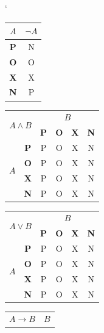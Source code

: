 \documentclass[11pt,a4paper]{article}
\begin{document}
\catcode`
\begin{table}[h]
    \begin{center}
        \begin{tabular}{|c|c|}\hline
            $A$   &   $\neg{A}$  \\ \hline
            \textbf{P}  &   N   \\  \hline
            \textbf{O}  &   O   \\  \hline
            \textbf{X}  &   X   \\  \hline
            \textbf{N}  &   P   \\ \hline
        \end{tabular}
        \begin{tabular}[p]{|c|c|c|c|c|c|}\hline
             \multicolumn{2}{|c|}{\multirow{2}{*}{$A \wedge B$}} & \multicolumn{4}{c|}{$B$}  \\ \cline{3-6}
             \multicolumn{2}{|c|}{} & \textbf{P} & \textbf{O} & \textbf{X} & \textbf{N} \\ \hline
             \multirow{4}{*}{$A$} & \textbf{P} & P & O & X & N \\ \cline{2-6}
             & \textbf{O} & P & O & X & N \\ \cline{2-6}
             & \textbf{X} & P & O & X & N \\ \cline{2-6}
             & \textbf{N} & P & O & X & N \\ \hline
        \end{tabular}
        \begin{tabular}[p]{|c|c|c|c|c|c|}\hline
             \multicolumn{2}{|c|}{\multirow{2}{*}{$A \vee B$}} & \multicolumn{4}{c|}{$B$}  \\ \cline{3-6}
             \multicolumn{2}{|c|}{} & \textbf{P} & \textbf{O} & \textbf{X} & \textbf{N} \\ \hline
             \multirow{4}{*}{$A$} & \textbf{P} & P & O & X & N \\ \cline{2-6}
             & \textbf{O} & P & O & X & N \\ \cline{2-6}
             & \textbf{X} & P & O & X & N \\ \cline{2-6}
             & \textbf{N} & P & O & X & N \\ \hline
        \end{tabular}
        \begin{tabular}[p]{|c|c|c|c|c|c|}\hline
             \multicolumn{2}{|c|}{\multirow{2}{*}{$A \rightarrow B$}} & \multicolumn{4}{c|}{$B$}  \\ \cline{3-6}

\end{tabular}
\end{center}
\end{table}
\end{document}
